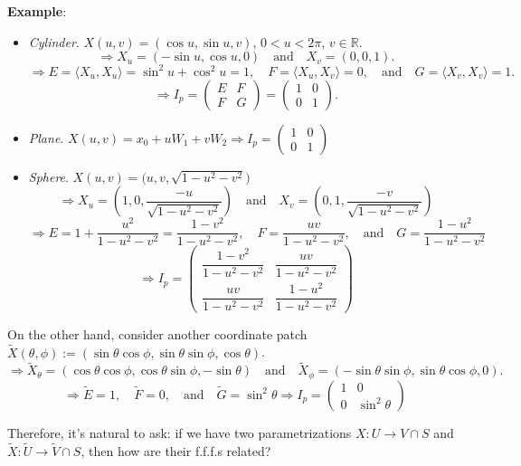 \noindent\textbf{Example}:
\begin{itemize}
\item \textit{Cylinder}. $X(u, v) = (\cos u, \sin u, v)$, $0 < u < 2\pi$, $v\in\mathbb{R}$.
\[
\Rightarrow X_u = (-\sin u, \cos u, 0) \quad\text{and}\quad X_v = (0, 0, 1).
\]
\[
\Rightarrow E = \langle X_u, X_u\rangle = \sin^2 u + \cos^2 u = 1, \quad F = \langle X_u, X_v\rangle = 0, \quad\text{and}\quad G = \langle X_v, X_v\rangle = 1.
\]
\[
\Rightarrow I_p = \begin{pmatrix}E & F\\ F & G\end{pmatrix} = \begin{pmatrix}1 & 0\\ 0 & 1\end{pmatrix}.
\]
\item \textit{Plane}. $X(u, v) = x_0 + uW_1 + vW_2 \Rightarrow I_p = \begin{pmatrix}1 & 0\\ 0 & 1\end{pmatrix}$
\item \textit{Sphere}. $X(u, v) = \big(u, v, \sqrt{1 - u^2 - v^2}\big)$
\[
\Rightarrow X_u = \left(1, 0, \frac{-u}{\sqrt{1 - u^2 - v^2}}\right) \quad\text{and}\quad X_v = \left(0, 1, \frac{-v}{\sqrt{1 - u^2 - v^2}}\right)
\]
\[
\Rightarrow E = 1 + \frac{u^2}{1 - u^2 - v^2} = \frac{1 - v^2}{1 - u^2 - v^2}, \quad F = \frac{uv}{1 - u^2 - v^2}, \quad\text{and}\quad G = \frac{1 - u^2}{1 - u^2 - v^2}
\]
\[
\Rightarrow I_p = \begin{pmatrix}\dfrac{1 - v^2}{1 - u^2 - v^2} & \dfrac{uv}{1 - u^2 - v^2}\\[3mm] \dfrac{uv}{1 - u^2 - v^2} & \dfrac{1 - u^2}{1 - u^2 - v^2}\end{pmatrix}
\]
\end{itemize}

\noindent On the other hand, consider another coordinate patch $\tilde{X}(\theta, \phi) := (\sin\theta\cos\phi, \sin\theta\sin\phi, \cos\theta)$.
\[
\Rightarrow \tilde{X}_\theta = (\cos\theta\cos\phi, \cos\theta\sin\phi, -\sin\theta) \quad\text{and}\quad \tilde{X}_\phi = (-\sin\theta\sin\phi, \sin\theta\cos\phi, 0).
\]
\[
\Rightarrow \tilde{E} = 1, \quad \tilde{F} = 0, \quad\text{and}\quad \tilde{G} = \sin^2\theta \Rightarrow I_p = \begin{pmatrix}1 & 0\\ 0 & \sin^2\theta\end{pmatrix}
\]

\noindent Therefore, it's natural to ask: if we have two parametrizations $X: U\to V\cap S$ and $\tilde{X}: \tilde{U}\to\tilde{V}\cap S$, then how are their f.f.f.s related?

